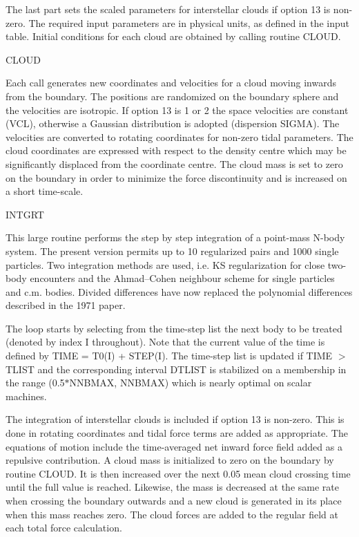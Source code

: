  The last part sets the scaled parameters for interstellar clouds if option 13
 is non-zero.  The required input parameters are in physical units, as defined
 in the input table.  Initial conditions for each cloud are obtained by calling
 routine CLOUD.
\bigskip
\bigskip
\centerline {CLOUD}
\bigskip

 Each call generates new coordinates and velocities for a cloud moving inwards
 from the boundary.  The positions are randomized on the boundary sphere and the
 velocities are isotropic.  If option 13 is 1 or 2 the space velocities are
 constant (VCL), otherwise a Gaussian distribution is adopted (dispersion
 SIGMA).  The velocities are converted to rotating coordinates for non-zero
 tidal parameters.  The cloud coordinates are expressed with respect to the
 density centre which may be significantly displaced from the coordinate
 centre.  The cloud mass is set to
 zero on the boundary in order to minimize the force discontinuity and is
 increased on a short time-scale.
\bigskip
\bigskip
\centerline {INTGRT}
\bigskip

 This large routine performs the step by step integration of a point-mass
 N-body system.  The present version permits up to 10 regularized pairs and 1000
 single particles.  Two integration methods are
 used, i.e. KS regularization for close two-body encounters and the
 Ahmad--Cohen neighbour scheme for single particles and c.m. bodies.  Divided
 differences have now replaced the polynomial differences described
 in the 1971 paper.

 The loop starts by selecting from the time-step list the next body to be
 treated (denoted by index I throughout).  Note that the current value 
 of the time is defined by TIME = T0(I) +
 STEP(I).  The time-step list is updated if TIME $>$ TLIST and the corresponding
 interval DTLIST is stabilized on a membership in the range
 (0.5$\ast$NNBMAX, NNBMAX) which is nearly optimal on scalar machines.

 The integration of interstellar clouds is included if option 13 is
 non-zero.  This is done in rotating coordinates and tidal force terms are added
 as appropriate.  The equations of motion include the time-averaged net
 inward force field added as a
 repulsive contribution.  A cloud mass is initialized to zero on the boundary by
 routine CLOUD.  It is then increased over the next 0.05 mean cloud
 crossing time until the full value is
 reached.  Likewise, the mass is decreased at the same rate when crossing the
 boundary outwards and a new cloud is generated in its place when this mass
 reaches zero.  The cloud forces are added to the regular field at each
 total force calculation.

